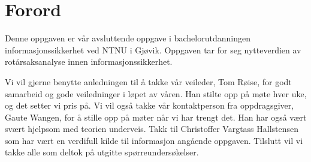 \chapter*{Forord} %
\label{kap:forord}

Denne oppgaven er vår avsluttende oppgave i bachelorutdanningen informasjonssikkerhet ved NTNU i Gjøvik. Oppgaven tar for seg nytteverdien av rotårsaksanalyse innen informasjonssikkerhet. 

Vi vil gjerne benytte anledningen til å takke vår veileder, Tom Røise, for godt samarbeid og gode veiledninger i løpet av våren. Han stilte opp på møte hver uke, og det setter vi pris på. Vi vil også takke vår kontaktperson fra oppdragsgiver, Gaute Wangen, for å stille opp på møter når vi har trengt det. Han har også vært svært hjelpsom med teorien underveis. Takk til Christoffer Vargtass Hallstensen som har vært en verdifull kilde til informasjon angående oppgaven. Tilslutt vil vi takke alle som deltok på utgitte spørreundersøkelser. 